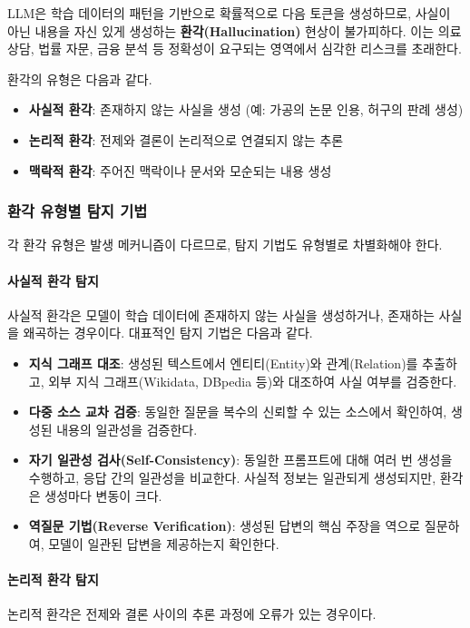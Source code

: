 LLM은 학습 데이터의 패턴을 기반으로 확률적으로 다음 토큰을 생성하므로, 사실이 아닌 내용을 자신 있게 생성하는 \textbf{환각(Hallucination)} 현상이 불가피하다. 이는 의료 상담, 법률 자문, 금융 분석 등 정확성이 요구되는 영역에서 심각한 리스크를 초래한다.

환각의 유형은 다음과 같다.
\begin{itemize}
 \item \textbf{사실적 환각}: 존재하지 않는 사실을 생성 (예: 가공의 논문 인용, 허구의 판례 생성)
 \item \textbf{논리적 환각}: 전제와 결론이 논리적으로 연결되지 않는 추론
 \item \textbf{맥락적 환각}: 주어진 맥락이나 문서와 모순되는 내용 생성
\end{itemize}

\subsubsection{환각 유형별 탐지 기법}

각 환각 유형은 발생 메커니즘이 다르므로, 탐지 기법도 유형별로 차별화해야 한다.

\paragraph{사실적 환각 탐지}
사실적 환각은 모델이 학습 데이터에 존재하지 않는 사실을 생성하거나, 존재하는 사실을 왜곡하는 경우이다. 대표적인 탐지 기법은 다음과 같다.

\begin{itemize}
 \item \textbf{지식 그래프 대조}: 생성된 텍스트에서 엔티티(Entity)와 관계(Relation)를 추출하고, 외부 지식 그래프(Wikidata, DBpedia 등)와 대조하여 사실 여부를 검증한다.
 \item \textbf{다중 소스 교차 검증}: 동일한 질문을 복수의 신뢰할 수 있는 소스에서 확인하여, 생성된 내용의 일관성을 검증한다.
 \item \textbf{자기 일관성 검사(Self-Consistency)}: 동일한 프롬프트에 대해 여러 번 생성을 수행하고, 응답 간의 일관성을 비교한다. 사실적 정보는 일관되게 생성되지만, 환각은 생성마다 변동이 크다.
 \item \textbf{역질문 기법(Reverse Verification)}: 생성된 답변의 핵심 주장을 역으로 질문하여, 모델이 일관된 답변을 제공하는지 확인한다.
\end{itemize}

\paragraph{논리적 환각 탐지}
논리적 환각은 전제와 결론 사이의 추론 과정에 오류가 있는 경우이다.

